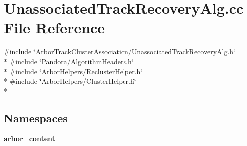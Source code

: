 \section{Unassociated\+Track\+Recovery\+Alg.\+cc File Reference}
\label{UnassociatedTrackRecoveryAlg_8cc}
{\ttfamily \#include \char`\"{}Arbor\+Track\+Cluster\+Association/\+Unassociated\+Track\+Recovery\+Alg.\+h\char`\"{}}\\*
{\ttfamily \#include \char`\"{}Pandora/\+Algorithm\+Headers.\+h\char`\"{}}\\*
{\ttfamily \#include \char`\"{}Arbor\+Helpers/\+Recluster\+Helper.\+h\char`\"{}}\\*
{\ttfamily \#include \char`\"{}Arbor\+Helpers/\+Cluster\+Helper.\+h\char`\"{}}\\*
\subsection*{Namespaces}
\begin{DoxyCompactItemize}
\item 
 {\bf arbor\+\_\+content}
\end{DoxyCompactItemize}
